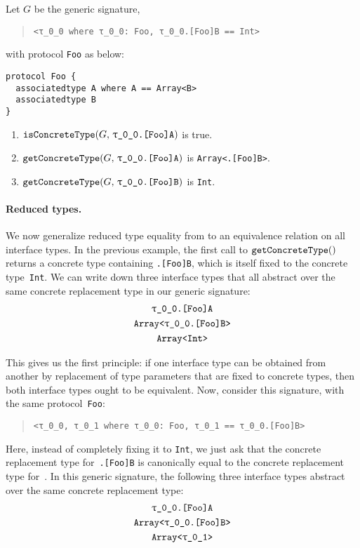 \documentclass[../generics]{subfiles}
\begin{document}
\begin{example}\label{concrete type query example}
Let $G$ be the generic signature,
\begin{quote}
\begin{verbatim}
<τ_0_0 where τ_0_0: Foo, τ_0_0.[Foo]B == Int>
\end{verbatim}
\end{quote}
with protocol \texttt{Foo} as below:
\begin{Verbatim}
protocol Foo {
  associatedtype A where A == Array<B>
  associatedtype B
}
\end{Verbatim}
\begin{enumerate}
\item $\Query{isConcreteType}{G,\,\texttt{\rT.[Foo]A}}$ is true.
\item $\Query{getConcreteType}{G,\,\texttt{\rT.[Foo]A}}$ is \texttt{Array<\rT.[Foo]B>}.
\item $\Query{getConcreteType}{G,\,\texttt{\rT.[Foo]B}}$ is \texttt{Int}.
\end{enumerate}
\end{example}

\paragraph{Reduced types.} We now generalize reduced type equality from  to an equivalence relation on all interface types. In the previous example, the first call to $\texttt{getConcreteType}()$ returns a concrete type containing \texttt{\rT.[Foo]B}, which is itself fixed to the concrete type~\texttt{Int}. We can write down three interface types that all abstract over the same concrete replacement type in our generic signature:
\begin{gather*}
\texttt{\rT.[Foo]A}\\
\texttt{Array<\rT.[Foo]B>}\\
\texttt{Array<Int>}
\end{gather*}

This gives us the first principle: if one interface type can be obtained from another by replacement of type parameters that are fixed to concrete types, then both interface types ought to be equivalent. Now, consider this signature, with the same protocol~\texttt{Foo}:
\begin{quote}
\begin{verbatim}
<τ_0_0, τ_0_1 where τ_0_0: Foo, τ_0_1 == τ_0_0.[Foo]B>
\end{verbatim}
\end{quote}
Here, instead of completely fixing it to \texttt{Int}, we just ask that the concrete replacement type for~\texttt{\rT.[Foo]B} is canonically equal to the concrete replacement type for~\rU. In this generic signature, the following three interface types abstract over the same concrete replacement type:
\begin{gather*}
\texttt{\rT.[Foo]A}\\
\texttt{Array<\rT.[Foo]B>}\\
\texttt{Array<\rU>}
\end{gather*}
\end{document}
